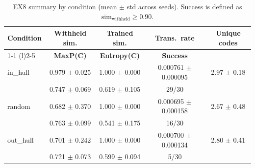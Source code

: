 \begin{table}[t]
\centering
\small
\setlength{\tabcolsep}{3.5pt} %
\renewcommand{\arraystretch}{1.05} %

\caption{EX8 summary by condition (mean $\pm$ std across seeds). Success is defined as $\mathrm{sim}_{\text{withheld}} \geq 0.90$.}
\label{tab:ex8_summary}

\begin{tabular*}{\linewidth}{@{\extracolsep{\fill}}lcccc}
\toprule
\textbf{Condition} & \textbf{Withheld sim.} & \textbf{Trained sim.} & \textbf{Trans.\ rate} & \textbf{Unique codes} \\
\cmidrule(r){1-1} \cmidrule(l){2-5}
\multicolumn{1}{l}{\textit{(N=30)}} & \textbf{MaxP(C)} & \textbf{Entropy(C)} & \textbf{Success} & \\
\midrule

in\_hull  & 0.979 $\pm$ 0.025 & 1.000 $\pm$ 0.000 & 0.000761 $\pm$ 0.000095 & 2.97 $\pm$ 0.18 \\
          & 0.747 $\pm$ 0.069 & 0.619 $\pm$ 0.105 & 29/30 & \\
\addlinespace

random    & 0.682 $\pm$ 0.370 & 1.000 $\pm$ 0.000 & 0.000695 $\pm$ 0.000158 & 2.67 $\pm$ 0.48 \\
          & 0.763 $\pm$ 0.099 & 0.541 $\pm$ 0.175 & 16/30 & \\
\addlinespace

out\_hull & 0.701 $\pm$ 0.242 & 1.000 $\pm$ 0.000 & 0.000700 $\pm$ 0.000134 & 2.80 $\pm$ 0.41 \\
          & 0.721 $\pm$ 0.073 & 0.599 $\pm$ 0.094 & 5/30 & \\
\bottomrule
\end{tabular*}
\end{table}